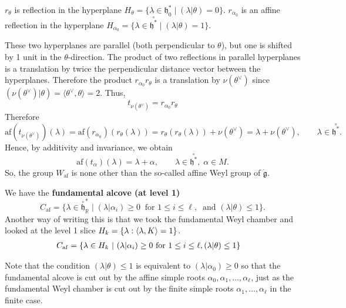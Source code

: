 \documentclass[12pt]{article}
\begin{document}
$r_\theta$ is reflection in the hyperplane $H_\theta = \{\lambda \in \mathfrak{h}_0^* \mid (\lambda|\theta)=0\}$. $r_{\alpha_0}$ is an affine reflection in the hyperplane $H_{\alpha_0} = \{\lambda \in \overset{\circ}{\mathfrak{h}^*} \mid (\lambda|\theta)=1\}$.

These two hyperplanes are parallel (both perpendicular to $ \theta $), but one is shifted by 1 unit in the $\theta$-direction. The product of two reflections in parallel hyperplanes is a translation by twice the perpendicular distance vector between the hyperplanes. Therefore the product $r_{\alpha_0} r_\theta$ is a translation by $\nu(\theta^\vee)$ since $(\nu(\theta^\vee)|\theta) = \langle \theta^\vee, \theta \rangle = 2$. Thus,
\[t_{\nu(\theta^\vee)} = r_{\alpha_0} r_\theta\]
Therefore
\[
    \mathrm{af}(t_{\nu(\theta^\vee)})(\lambda)
    = \mathrm{af}(r_{\alpha_0})(r_\theta(\lambda)) = r_\theta(r_\theta(\lambda)) + \nu(\theta^\vee)
    = \lambda + \nu(\theta^\vee), \qquad \lambda \in \overset{\circ}{\mathfrak{h}^*}.
\]
Hence, by additivity and invariance, we obtain
\begin{equation} \label{6.6.3}
    \mathrm{af}(t_\alpha)(\lambda) = \lambda + \alpha,
    \qquad \lambda \in \overset{\circ}{\mathfrak{h}^*}, \; \alpha \in M.
\end{equation}
So, the group $W_{\mathrm{af}}$ is none other than the so-called affine Weyl group of $\dot{\mathfrak{g}}$.

\begin{definition}
    We have the \textbf{fundamental alcove (at level 1)}
    \[
        C_{\mathrm{af}} = \{ \lambda \in \overset{\circ}{\mathfrak{h}}^*_{\mathbb{R}} \mid
        (\lambda|\alpha_i) \geq 0 \;\; \text{for } 1 \leq i \leq \ell,\;\;
        \text{and } (\lambda|\theta) \leq 1 \}.
    \]
    Another way of writing this is that we took the fundamental Weyl chamber and looked at the level 1 slice $H_k = \{\lambda : \langle \lambda, K \rangle = 1\}$. \begin{align*}
        C_{\mathrm{af}} & = \{\lambda \in H_k \ \vert \  (\lambda|\alpha_i) \geq 0 \text{ for } 1 \leq i \leq \ell, (\lambda|\theta) \leq 1\}
    \end{align*}
\end{definition}
Note that the condition $(\lambda | \theta ) \leq 1$ is equivalent to $(\lambda | \alpha_0) \geq 0$ so that the fundamental alcove is cut out by the affine simple roots $\alpha_0, \alpha_1, \ldots, \alpha_\ell$, just as the fundamental Weyl chamber is cut out by the finite simple roots $\alpha_1, \ldots, \alpha_\ell$ in the finite case.
\end{document}
